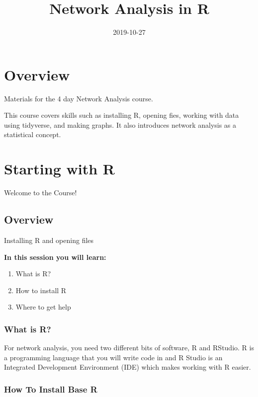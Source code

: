 \documentclass[]{book}
\title{Network Analysis in R}
\author{}
\date{2019-10-27}
\providecommand{\tightlist}{%
  \setlength{\itemsep}{0pt}\setlength{\parskip}{0pt}}
\begin{document}
\maketitle

{
\setcounter{tocdepth}{1}
\tableofcontents
}
\chapter*{Overview}\label{overview}

Materials for the 4 day Network Analysis course.

This course covers skills such as installing R, opening fies, working
with data using tidyverse, and making graphs. It also introduces network
analysis as a statistical concept.

\chapter{Starting with R}\label{starting-with-r}

{Welcome to the Course!}

\section{Overview}\label{overview-1}

Installing R and opening files

\textbf{In this session you will learn:}

\begin{enumerate}
\def\labelenumi{\arabic{enumi}.}
\tightlist
\item
  What is R?
\item
  How to install R
\item
  Where to get help
\end{enumerate}

\subsection{What is R?}\label{what-is-r}

For network analysis, you need two different bits of software, R and
RStudio. R is a programming language that you will write code in and R
Studio is an Integrated Development Environment (IDE) which makes
working with R easier.

\subsection{How To Install Base R}\label{how-to-install-base-r}
\end{document}
